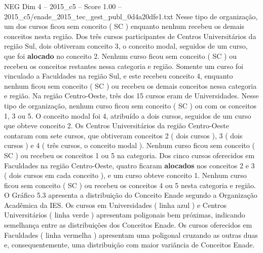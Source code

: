 \begin{textsample}{NEG Dim 4 – 2015\_c5 – Score 1.00 – 2015\_c5/enade\_2015\_tec\_gest\_publ\_0d4a20dfe1.txt}
Nesse tipo de organização, um dos cursos ficou sem conceito ( SC ) enquanto nenhum recebeu os demais conceitos nesta região.
Dos três cursos participantes de Centros Universitários da região Sul, dois obtiveram conceito 3, o conceito modal, seguidos de um curso, que foi \textbf{alocado} no conceito 2.
Nenhum curso ficou sem conceito ( SC ) ou recebeu os conceitos restantes nessa categoria e região.
Somente um curso foi vinculado a Faculdades na região Sul, e este recebeu conceito 4, enquanto nenhum ficou sem conceito ( SC ) ou recebeu os demais conceitos nessa categoria e região.
Na região Centro-Oeste, três dos 15 cursos eram de Universidades.
Nesse tipo de organização, nenhum curso ficou sem conceito ( SC ) ou com os conceitos 1, 3 ou 5.
O conceito modal foi 4, atribuído a dois cursos, seguidos de um curso que obteve conceito 2.
Os Centros Universitários da região Centro-Oeste contaram com sete cursos, que obtiveram conceitos 2 ( dois cursos ), 3 ( dois cursos ) e 4 ( três cursos, o conceito modal ).
Nenhum curso ficou sem conceito ( SC ) ou recebeu os conceitos 1 ou 5 na categoria.
Dos cinco cursos oferecidos em Faculdades na região Centro-Oeste, quatro ficaram \textbf{alocados} nos conceitos 2 e 3 ( dois cursos em cada conceito ), e um curso obteve conceito 1.
Nenhum curso ficou sem conceito ( SC ) ou recebeu os conceitos 4 ou 5 nesta categoria e região.
O Gráfico 5.3 apresenta a distribuição do Conceito Enade segundo a Organização Acadêmica da IES.
Os cursos em Universidades ( linha azul ) e Centros Universitários ( linha verde ) apresentam poligonais bem próximas, indicando semelhança entre as distribuições dos Conceitos Enade.
Os cursos oferecidos em Faculdades ( linha vermelha ) apresentam uma poligonal cruzando as outras duas e, consequentemente, uma distribuição com maior variância de Conceitos Enade.

\end{textsample}
